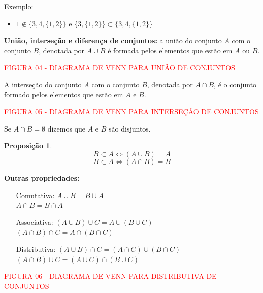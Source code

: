 \documentclass[oneside,a4paper,12pt]{article}
\newtheorem{proposition}{Proposição}[section]
\begin{document}
Exemplo:
\begin{itemize}
	\item $1 \notin \{3, 4, \{1,2\}\}$ e $\{3, \{1,2\}\} \subset \{3, 4, \{1,2\}\}$
\end{itemize}

\textbf{União, interseção e diferença de conjuntos:} a união do conjunto $A$ com o conjunto $B$, denotada por $A \cup B$ é formada pelos elementos que estão em $A$ ou $B$.

\vspace{90pt}

\begin{center}
	\textcolor{red}{FIGURA 04 - DIAGRAMA DE VENN PARA UNIÃO DE CONJUNTOS}
\end{center}

A interseção do conjunto $A$ com o conjunto $B$, denotada por $A \cap B$, é o conjunto formado pelos elementos que estão em $A$ e $B$.

\vspace{90pt}
\begin{center}
	\textcolor{red}{FIGURA 05 - DIAGRAMA DE VENN PARA INTERSEÇÃO DE CONJUNTOS}	
\end{center}
	
Se $A \cap B = \emptyset$ dizemos que $A$ e $B$ são disjuntos.

\begin{proposition}
	$$ B \subset A \Leftrightarrow (A \cup B) = A$$
	$$ B \subset A \Leftrightarrow (A \cap B) = B$$
\end{proposition}

\textbf{Outras propriedades:}
\begin{enumerate}
	\item[Comutativa:] $A \cup B = B \cup A$ \\ $A \cap B = B \cap A$
	\item[Associativa:] $(A \cup B)\cup C = A \cup (B \cup C)$ \\ $(A \cap B) \cap C = A \cap (B \cap C)$
	\item[Distributiva:] $(A \cup B) \cap C = (A \cap C) \cup (B \cap C)$ \\ $(A \cap B)\cup C = (A \cup C) \cap (B \cup C)$
\end{enumerate}

\vspace{100pt}
\begin{center}
	\textcolor{red}{FIGURA 06 - DIAGRAMA DE VENN PARA DISTRIBUTIVA DE CONJUNTOS}	
\end{center}
	
\end{document}
